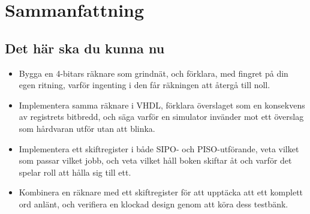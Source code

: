 
\section{Sammanfattning}
\label{c6:sec:review}

\subsection*{Det här ska du kunna nu}
\begin{itemize}
  \item Bygga en 4-bitars räknare som grindnät, och förklara, med fingret på din egen ritning,
    varför ingenting i den får räkningen att återgå till noll.
  \item Implementera samma räknare i VHDL, förklara överslaget som en konsekvens av registrets
    bitbredd, och säga varför en simulator invänder mot ett överslag som hårdvaran utför utan att
    blinka.
  \item Implementera ett skiftregister i både SIPO- och PISO-utförande, veta vilket som passar
    vilket jobb, och veta vilket håll boken skiftar åt och varför det spelar roll att hålla sig
    till ett.
  \item Kombinera en räknare med ett skiftregister för att upptäcka att ett komplett ord anlänt,
    och verifiera en klockad design genom att köra dess testbänk.
\end{itemize}

